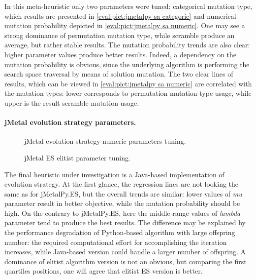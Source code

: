In this meta-heuristic only two parameters were tuned: categorical mutation type, which results are presented in \cref{eval:pict:jmetalpy sa categoric} and numerical mutation probability depicted in \cref{eval:pict:jmetalpy sa numeric}. One may see a strong dominance of permutation mutation type, while scramble produce an average, but rather stable results. The mutation probability trends are also clear: higher parameter values produce better results. Indeed, a dependency on the mutation probability is obvious, since the underlying algorithm is performing the search space traversal by means of solution mutation. The two clear lines of results, which can be viewed in \cref{eval:pict:jmetalpy sa numeric} are correlated with the mutation types: lower corresponds to permutation mutation type usage, while upper is the result scramble mutation usage.


\paragraph{jMetal evolution strategy parameters.}
\begin{figure}[h]
	\centering
	\vspace{-10pt}
	
	\caption{jMetal evolution strategy numeric parameters tuning.}
	\vspace{-15pt}
	\label{eval:pict:jmetal es numeric}
\end{figure}

\begin{wrapfigure}{R}{0.5\textwidth}
	\centering
	\vspace{-20pt}
	
	\label{eval:pict:jmetal es categoric}
	\caption{jMetal ES elitist parameter tuning.}
	\vspace{-30pt}
\end{wrapfigure}

The final heuristic under investigation is a Java-based implementation of evolution strategy. At the first glance, the regression lines are not looking the same as for jMetalPy.ES, but the overall trends are similar: lower values of \emph{mu} parameter result in better objective, while the mutation probability should be high. On the contrary to jMetalPy.ES, here the middle-range values of \emph{lambda} parameter tend to produce the best results. The difference may be explained by the performance degradation of Python-based algorithm with large offspring number: the required computational effort for accomplishing the iteration increases, while Java-based version could handle a larger number of offspring. A dominance of elitist algorithm version is not an obvious, but comparing the first quartiles positions, one will agree that elitist ES version is better.


